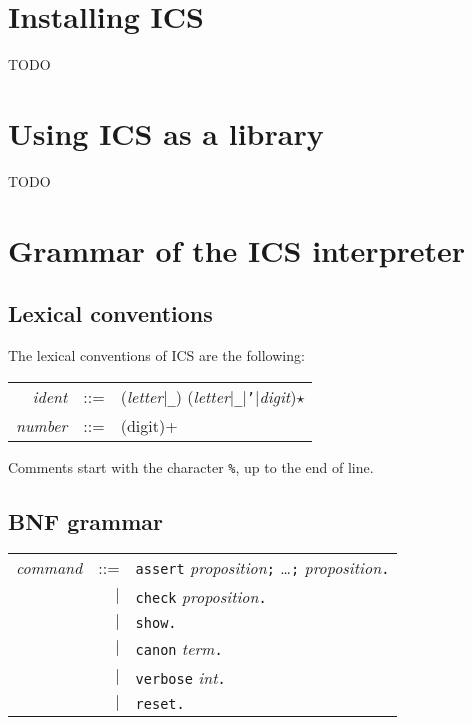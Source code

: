 \documentclass[12pt]{article}
\begin{document}
\section{Installing ICS}

TODO


\section{Using ICS as a library}

TODO


\section{Grammar of the ICS interpreter}

\subsection{Lexical conventions}

The lexical conventions of ICS are the following:
\begin{center}
  \begin{tabular}{rrl}
    \textit{ident} & ::= & (\textit{letter}$|$\texttt{\_}) 
                           (\textit{letter}$|$\texttt{\_}$|$\texttt{'}$|$\textit{digit})$\star$
                           \\
    \textit{number} & ::= & (digit)+
  \end{tabular}
\end{center}
Comments start with the character \texttt{\%}, up to the end of line.

\subsection{BNF grammar}

\newcommand{\comm}{\textit{command}}
\newcommand{\term}{\textit{term}}
\newcommand{\prop}{\textit{proposition}}

\begin{center}
  \begin{tabular}{rrl}
    \comm & ::= & \texttt{assert} \prop\texttt{;} \dots\texttt{;} 
                  \prop\texttt{.} \\
          & $|$ & \texttt{check} \prop\texttt{.} \\
          & $|$ & \texttt{show}\texttt{.} \\
          & $|$ & \texttt{canon} \term\texttt{.} \\
          & $|$ & \texttt{verbose} \textit{int}\texttt{.} \\
          & $|$ & \texttt{reset.} \\
  \end{tabular}
\end{center}
\end{document}
